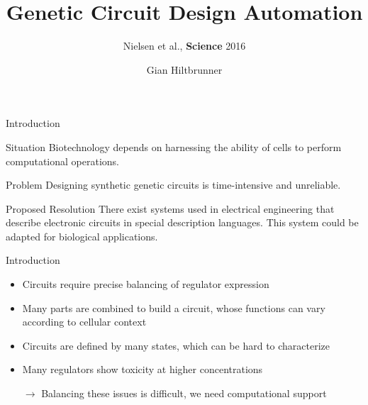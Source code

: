 \documentclass[10pt]{beamer}
\title{Genetic Circuit Design Automation}
\subtitle{Nielsen et al., \textbf{Science} 2016}
\date{}
\author{Gian Hiltbrunner}
\institute{CBB Seminar, ETH Zurich}
\begin{document}
\maketitle


\begin{frame}[fragile]{Introduction}

    {
      \begin{block}{Situation}
        Biotechnology depends on harnessing the ability of cells to perform computational operations. 
      \end{block}
      \begin{alertblock}{Problem}
        Designing synthetic genetic circuits is time-intensive and unreliable. 
      \end{alertblock}
      \begin{exampleblock}{Proposed Resolution}
        There exist systems used in electrical engineering that describe electronic circuits in special description languages. This system could be adapted for biological applications.
      \end{exampleblock}}
      
\end{frame}

\begin{frame}{Introduction}
  \begin{itemize}[<+- | alert@+>]
    \item Circuits require precise balancing of regulator expression
    \item Many parts are combined to build a circuit, whose functions can vary according to cellular context
    \item Circuits are defined by many states, which can be hard to characterize
    \item Many regulators show toxicity at higher concentrations
    \item[$\rightarrow$] Balancing these issues is difficult, we need computational support
  \end{itemize}
\end{frame}
\end{document}
